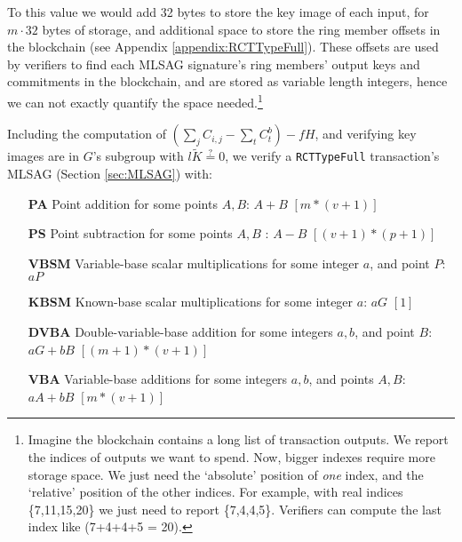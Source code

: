 To this value we would add 32 bytes to store the key image of each input, for $m \cdot 32$ bytes of storage, and additional space to store the ring member offsets in the blockchain (see Appendix \ref{appendix:RCTTypeFull}). These offsets are used by verifiers to find each MLSAG signature's ring members' output keys and commitments in the blockchain, and are stored as variable length integers, hence we can not exactly quantify the space needed.\footnote{Imagine the blockchain contains a long list of transaction outputs. We report the indices of outputs we want to spend. Now, bigger indexes require more storage space. We just need the `absolute' position of {\em one} index, and the `relative' position of the other indices. For example, with real indices \{7,11,15,20\} we just need to report \{7,4,4,5\}. Verifiers can compute the last index like (7+4+4+5 = 20).}%

Including the computation of \((\sum\limits_j C_{i, j} - \sum\limits_t C^b_{t}) - f H\), and verifying key images are in $G$'s subgroup with $l \tilde{K} \stackrel{?}{=} 0$, we verify a {\tt RCTTypeFull} transaction's MLSAG (Section \ref{sec:MLSAG}) with:

\begin{itemize}
    \setlength\itemsep{\listspace}
    \item [\textbf{PA}] Point addition for some points $A, B$: $A + B$ \quad \([m*(v+1)]\)%
    \item [\textbf{PS}] Point subtraction for some points $A, B$ : $A - B$ \quad \([(v+1)*(p+1)]\)%
    \item [\textbf{VBSM}] Variable-base scalar multiplications for some integer $a$, and point $P$: $a P$ \quad [$m$]%
    \item [\textbf{KBSM}] Known-base scalar multiplications for some integer $a$: $a G$ \quad \([1]\)
    \item [\textbf{DVBA}] Double-variable-base addition for some integers $a, b$, and point $B$: $a G + b B$ \quad \([(m+1)*(v+1)]\)%
    \item [\textbf{VBA}] Variable-base additions for some integers $a, b$, and points $A, B$: $a A + b B$ \quad \([m*(v+1)]\)%
\end{itemize}


